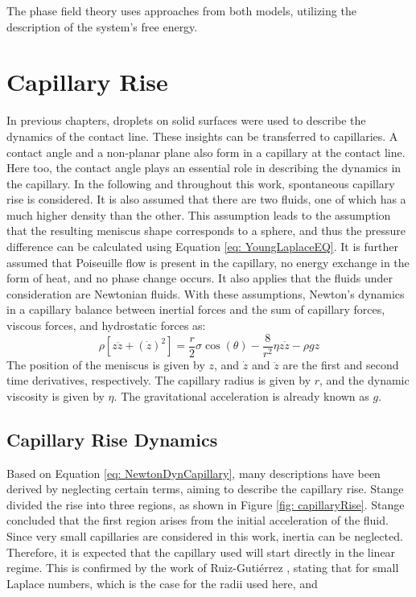 The phase field theory uses approaches from both models, utilizing the description of the system's free energy. 

\section{Capillary Rise}
In previous chapters, droplets on solid surfaces were used to describe the dynamics of the contact line. These insights can be transferred to capillaries. A contact angle and a non-planar plane also form in a capillary at the contact line. Here too, the contact angle plays an essential role in describing the dynamics in the capillary. In the following and throughout this work, spontaneous capillary rise is considered. It is also assumed that there are two fluids, one of which has a much higher density than the other. This assumption leads to the assumption that the resulting meniscus shape corresponds to a sphere, and thus the pressure difference can be calculated using Equation \ref{eq: YoungLaplaceEQ}. It is further assumed that Poiseuille flow is present in the capillary, no energy exchange in the form of heat, and no phase change occurs. It also applies that the fluids under consideration are Newtonian fluids.
With these assumptions, Newton's dynamics in a capillary balance between inertial forces and the sum of capillary forces, viscous forces, and hydrostatic forces as:
\begin{equation}
\label{eq: NewtonDynCapillary}
    \rho [z\ddot{z}+(\dot{z})^{2}]=\frac{r}{2}\sigma \cos(\theta)- \frac{8}{r^{2}}\eta z \dot{z}-\rho g z
\end{equation}
The position of the meniscus is given by $z$, and $\dot{z}$ and $\ddot{z}$ are the first and second time derivatives, respectively. The capillary radius is given by $r$, and the dynamic viscosity is given by $\eta$. The gravitational acceleration is already known as $g$.
\subsection{Capillary Rise Dynamics}
Based on Equation \ref{eq: NewtonDynCapillary}, many descriptions have been derived by neglecting certain terms, aiming to describe the capillary rise. Stange \cite{stange2003CapillaryDrivenFlow} divided the rise into three regions, as shown in Figure \ref{fig: capillaryRise}. Stange concluded that the first region arises from the initial acceleration of the fluid. Since very small capillaries are considered in this work, inertia can be neglected. Therefore, it is expected that the capillary used will start directly in the linear regime. This is confirmed by the work of Ruiz-Gutiérrez \cite{ruiz-gutierrez2022LongCrossoverDynamics}, stating that for small Laplace numbers, which is the case for the radii used here, and 


